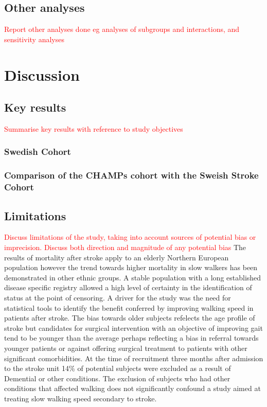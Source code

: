 \documentclass[a4paper,12pt]{article}
\begin{document}
\subsection{Other analyses} \textcolor{red}{Report other analyses done eg analyses of subgroups and interactions, and sensitivity analyses}
\section{Discussion}
\subsection{Key results}  \textcolor{red}{Summarise key results with reference to study objectives}
\subsubsection{Swedish Cohort}
\subsubsection{Comparison of the CHAMPs cohort with the Sweish Stroke Cohort}
\subsection{Limitations}  \textcolor{red}{Discuss limitations of the study, taking into account sources of potential bias or imprecision. Discuss both direction and magnitude of any potential bias} The results of mortality after stroke apply to an elderly Northern European population however the trend towards higher mortality in slow walkers has been demonstrated in other ethnic groups\cite{Chiaranda2013,Ostir2007}. A stable population with a long established disease specific registry allowed a high level of certainty in the identification of status at the point of censoring. A driver for the study was the need for statistical tools to identify the benefit conferred by improving walking speed in patients after stroke. The bias towards older subjects refelects the age profile of stroke but candidates for surgical intervention with an objective of improving gait tend to be younger than the average perhaps reflecting a bias in referral towards younger patients or against offering surgical treatment to patients with other significant comorbidities. At the time of recruitment three months after admission to the stroke unit 14\% of potential subjects were excluded as a result of Demential or other conditions. The exclusion of subjects who had other conditions that affected walking does not significantly confound a study aimed at treating slow walking speed secondary to stroke. 
\end{document}
